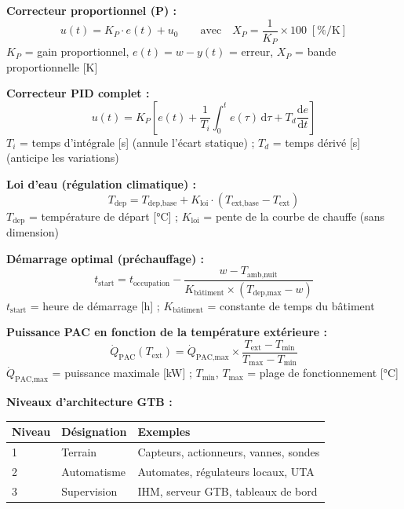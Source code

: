 \begin{tcolorbox}[
  enhanced, colback=FedBlue!3, colframe=FedBlue!50,
  fonttitle=\bfseries\sffamily, coltitle=FedBlue,
  title={FICHE MÉMO — Régulation et GTB}, boxrule=0.8pt, arc=2pt,
  width=\textwidth
]

\textbf{Correcteur proportionnel (P) :}
\[
  u(t) = K_P \cdot e(t) + u_0
  \qquad \text{avec} \quad X_P = \frac{1}{K_P} \times 100 \; [\si{\percent\per\kelvin}]
\]
$K_P$ = gain proportionnel, $e(t) = w - y(t)$ = erreur, $X_P$ = bande proportionnelle [\si{\kelvin}]

\medskip
\textbf{Correcteur PID complet :}
\[
  u(t) = K_P \left[ e(t) + \frac{1}{T_i} \int_0^t e(\tau)\,\mathrm{d}\tau + T_d \frac{\mathrm{d}e}{\mathrm{d}t} \right]
\]
$T_i$ = temps d'intégrale [\si{\second}] (annule l'écart statique) ; $T_d$ = temps dérivé [\si{\second}] (anticipe les variations)

\medskip
\textbf{Loi d'eau (régulation climatique) :}
\[
  T_{\text{dep}} = T_{\text{dep,base}} + K_{\text{loi}} \cdot (T_{\text{ext,base}} - T_{\text{ext}})
\]
$T_{\text{dep}}$ = température de départ [\si{\celsius}] ; $K_{\text{loi}}$ = pente de la courbe de chauffe (sans dimension)

\medskip
\textbf{Démarrage optimal (préchauffage) :}
\[
  t_{\text{start}} = t_{\text{occupation}} - \frac{w - T_{\text{amb,nuit}}}{K_{\text{bâtiment}} \times (T_{\text{dep,max}} - w)}
\]
$t_{\text{start}}$ = heure de démarrage [\si{\hour}] ; $K_{\text{bâtiment}}$ = constante de temps du bâtiment

\medskip
\textbf{Puissance PAC en fonction de la température extérieure :}
\[
  \dot{Q}_{\text{PAC}}(T_{\text{ext}}) = \dot{Q}_{\text{PAC,max}} \times \frac{T_{\text{ext}} - T_{\text{min}}}{T_{\text{max}} - T_{\text{min}}}
\]
$\dot{Q}_{\text{PAC,max}}$ = puissance maximale [\si{\kW}] ; $T_{\text{min}}$, $T_{\text{max}}$ = plage de fonctionnement [\si{\celsius}]

\medskip
\textbf{Niveaux d'architecture GTB :}

\begin{tabular}{@{}lll@{}}
  \toprule
  Niveau & Désignation & Exemples \\
  \midrule
  1 & Terrain & Capteurs, actionneurs, vannes, sondes \\
  2 & Automatisme & Automates, régulateurs locaux, UTA \\
  3 & Supervision & IHM, serveur GTB, tableaux de bord \\
  \bottomrule
\end{tabular}

\end{tcolorbox}

\finchapitre
